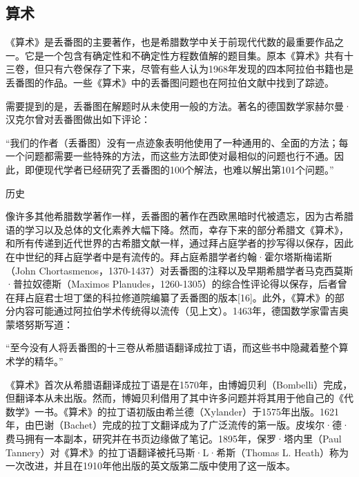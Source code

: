 \subsection{算术}
《算术》是丢番图的主要著作，也是希腊数学中关于前现代代数的最重要作品之一。它是一个包含有确定性和不确定性方程数值解的题目集。原本《算术》共有十三卷，但只有六卷保存了下来，尽管有些人认为1968年发现的四本阿拉伯书籍也是丢番图的作品。一些《算术》中的丢番图问题也在阿拉伯文献中找到了踪迹。

需要提到的是，丢番图在解题时从未使用一般的方法。著名的德国数学家赫尔曼·汉克尔曾对丢番图做出如下评论：

“我们的作者（丢番图）没有一点迹象表明他使用了一种通用的、全面的方法；每一个问题都需要一些特殊的方法，而这些方法即使对最相似的问题也行不通。因此，即便现代学者已经研究了丢番图的100个解法，也难以解出第101个问题。”

历史

像许多其他希腊数学著作一样，丢番图的著作在西欧黑暗时代被遗忘，因为古希腊语的学习以及总体的文化素养大幅下降。然而，幸存下来的部分希腊文《算术》，和所有传递到近代世界的古希腊文献一样，通过拜占庭学者的抄写得以保存，因此在中世纪的拜占庭学者中是有流传的。拜占庭希腊学者约翰·霍尔塔斯梅诺斯（John Chortasmenos，1370-1437）对丢番图的注释以及早期希腊学者马克西莫斯·普拉奴德斯（Maximos Planudes，1260-1305）的综合性评论得以保存，后者曾在拜占庭君士坦丁堡的科拉修道院编纂了丢番图的版本[16]。此外，《算术》的部分内容可能通过阿拉伯学术传统得以流传（见上文）。1463年，德国数学家雷吉奥蒙塔努斯写道：

“至今没有人将丢番图的十三卷从希腊语翻译成拉丁语，而这些书中隐藏着整个算术学的精华。”

《算术》首次从希腊语翻译成拉丁语是在1570年，由博姆贝利（Bombelli）完成，但翻译本从未出版。然而，博姆贝利借用了其中许多问题并将其用于他自己的《代数学》一书。《算术》的拉丁语初版由希兰德（Xylander）于1575年出版。1621年，由巴谢（Bachet）完成的拉丁文翻译成为了广泛流传的第一版。皮埃尔·德·费马拥有一本副本，研究并在书页边缘做了笔记。1895年，保罗·塔内里（Paul Tannery）对《算术》的拉丁语翻译被托马斯·L·希斯（Thomas L. Heath）称为一次改进，并且在1910年他出版的英文版第二版中使用了这一版本。